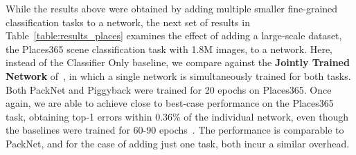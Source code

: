 \documentclass{llncs}
\begin{document}
While the results above were obtained by adding multiple smaller fine-grained classification tasks to a network, the next set of results in Table~\ref{table:results_places} examines the effect of adding a large-scale dataset, the Places365 scene classification task with 1.8M images, to a network.
Here, instead of the Classifier Only baseline, we compare against the {\bf Jointly Trained Network} of~\cite{zhou2017places}, in which a single network is simultaneously trained for both tasks. 
Both PackNet and Piggyback were trained for 20 epochs on Places365.
Once again, we are able to achieve close to best-case performance on the Places365 task, obtaining top-1 errors within 0.36\% of the individual network, even though the baselines were trained for 60-90 epochs~\cite{zhou2017places}. The performance is comparable to PackNet, and for the case of adding just one task, both incur a similar overhead.
\end{document}
